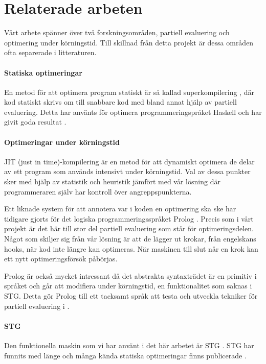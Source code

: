 \documentclass[Rapport]{subfiles}
\begin{document}
\section{Relaterade arbeten}

Vårt arbete spänner över två forskningsområden, partiell evaluering
och optimering under körningstid. Till skillnad från detta projekt 
är dessa områden ofta separerade i litteraturen.

\paragraph{Statiska optimeringar} 
En metod för att optimera program statiskt är så kallad superkompilering \cite{srensen1995algorithm}, där kod statiskt skrivs om till snabbare kod med bland annat hjälp av partiell evaluering. Detta har använts för optimera programmeringspråket Haskell och har givit goda resultat \cite{mitchell2007supercompiler}.


\paragraph{Optimeringar under körningstid}
JIT (just in time)-kompilering är en metod för att dynamiskt optimera
de delar av ett program som används intensivt under körningstid. Val av
dessa punkter sker med hjälp av statistik och heuristik jämfört med vår
lösning där programmeraren själv har kontroll över angreppspunkterna. 

Ett liknade system för att annotera var i koden en optimering ska ske har tidigare gjorts för det logiska programmeringsspråket Prolog \cite{bolz-automatic}.
Precis som i vårt projekt är det här till stor del partiell evaluering som står för optimeringsdelen. Något som skiljer sig från vår lösning är att de lägger ut krokar, från engelskans hooks, när kod inte längre kan optimeras. När maskinen till slut når en krok kan ett nytt optimeringsförsök påbörjas. 

Prolog är också mycket intressant då det abstrakta syntaxträdet är en primitiv i språket och går att modifiera under körningstid, en funktionalitet som saknas i STG.
Detta gör Prolog till ett tacksamt språk att testa och utveckla tekniker för partiell evaluering i \cite{ecce}.



\paragraph{STG}
Den funktionella maskin som vi har använt i det här arbetet är 
STG \cite{stg}. STG har funnits med länge och många kända statiska optimeringar finns publicerade \cite{santos}.
\end{document}
